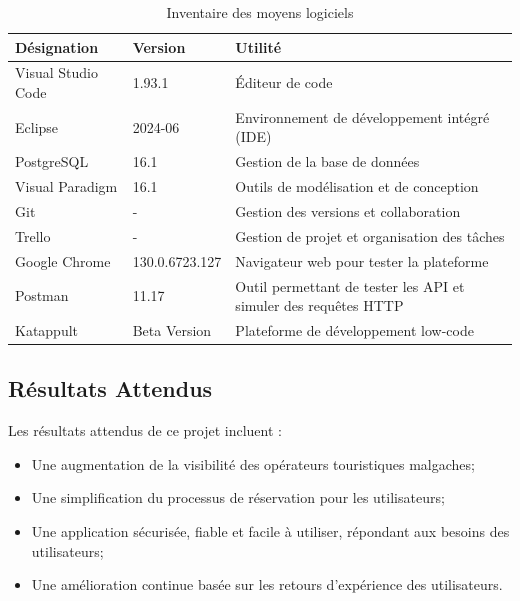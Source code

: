 \documentclass[12pt]{report}
\begin{document}
				\begin{longtable}{|p{4cm}|p{3cm}|p{7cm}|}
				  \caption{Inventaire des moyens logiciels}
				  \label{tab:moyensLogiciels}\\
				      \hline
				      \textbf{Désignation} & \textbf{Version} & \textbf{Utilité}\\
				      \hline
				\endfirsthead
				\endhead				
				      Visual Studio Code & 1.93.1 & Éditeur de code\\
				     \hline
				     Eclipse & 2024-06 & Environnement de développement intégré (IDE)\\
					\hline
 						PostgreSQL & 16.1 & Gestion de la base de données\\
					\hline
					Visual Paradigm & 16.1 & Outils de modélisation et de conception\\
					\hline
					Git & - & Gestion des versions et collaboration\\
					\hline
					Trello & - & Gestion de projet et organisation des tâches\\
					\hline
					Google Chrome & 130.0.6723.127 & Navigateur web pour tester la plateforme\\
					\hline
					Postman & 11.17 & Outil permettant de tester les API et simuler des requêtes HTTP\\
					\hline
					Katappult & Beta Version & Plateforme de développement low-code\\
					\hline 
				\end{longtable}
				\FloatBarrier


				\subsection{Résultats Attendus}

				\hspace{15pt} Les résultats attendus de ce projet incluent :
				
				\begin{itemize}
					\item Une augmentation de la visibilité des opérateurs touristiques malgaches;
					\item Une simplification du processus de réservation pour les utilisateurs;
					\item Une application sécurisée, fiable et facile à utiliser, répondant aux besoins des utilisateurs;
					\item Une amélioration continue basée sur les retours d'expérience des utilisateurs.
				\end{itemize}
\end{document}
